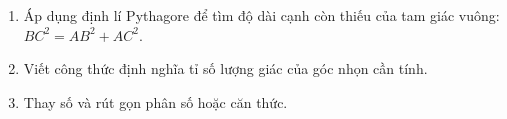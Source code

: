 \begin{enumerate}
\item Áp dụng định lí Pythagore để tìm độ dài cạnh còn thiếu của tam giác vuông: $BC^2 = AB^2 + AC^2$.
\item Viết công thức định nghĩa tỉ số lượng giác của góc nhọn cần tính.
\item Thay số và rút gọn phân số hoặc căn thức.
\end{enumerate}
